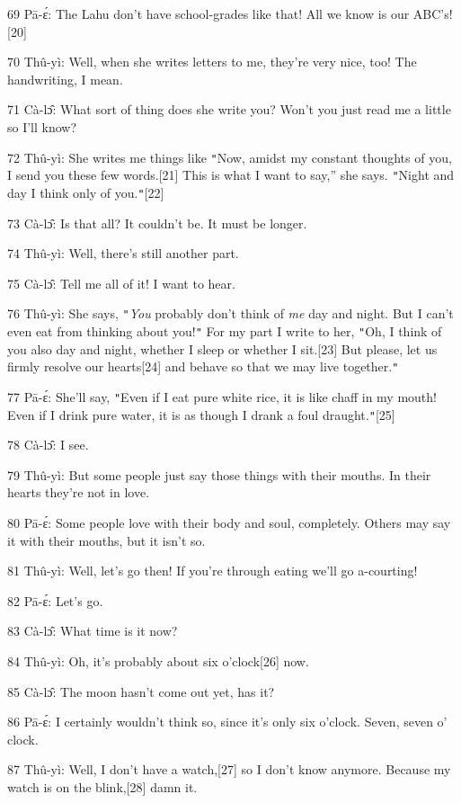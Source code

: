 {69 Pā-ɛ́: The Lahu don't have school-grades like that! All we know
is our ABC's![20]}

{70 Thû-yì: Well, when she writes letters to me, they're very nice, too!
The handwriting, I mean.}

{71 Cà-lɔ̂: What sort of thing does she write you? Won't you just read
me a little so I'll know?}

{72 Thû-yì: She writes me things like \texttt{"}Now, amidst my constant
thoughts of you, I send you these few words.[21] This is what I want to say,''
she says. \texttt{"}Night and day I think only of you.\texttt{"}[22]}

{73 Cà-lɔ̂: Is that all? It couldn't be. It must be longer.}

{74 Thû-yì: Well, there's still another part.}

{75 Cà-lɔ̂: Tell me all of it! I want to hear.}

{76 Thû-yì: She says, \texttt{"}}{\textit{You}}{ probably
don't think of }{\textit{me}}{ day and night. But I can't even eat
from thinking about you!\texttt{"} For my part I write to her, \texttt{"}Oh, I
think of you also day and night, whether I sleep or whether I sit.[23] But please,
let us firmly resolve our hearts[24] and behave so that we may live together.\texttt{"}
}

{77 Pā-ɛ́: She'll say, \texttt{"}Even if I eat pure white rice, it is
like chaff in my mouth! Even if I drink pure water, it is as though I drank a foul
draught.\texttt{"}[25]}

{78 Cà-lɔ̂: I see.}

{79 Thû-yì: But some people just say those things with their mouths. In
their hearts they're not in love.}

{80 Pā-ɛ́: Some people love with their body and soul, completely. Others
may say it with their mouths, but it isn't so.}

{81 Thû-yì: Well, let's go then! If you're through eating we'll go a-courting!}

{82 Pā-ɛ́: Let's go.}

{83 Cà-lɔ̂: What time is it now?}

{84 Thû-yì: Oh, it's probably about}{\textit{ }}{six o'clock[26]
now.}

{85 Cà-lɔ̂: The moon hasn't come out yet, has it?}

{86 Pā-ɛ́: I certainly wouldn't think so, since it's only six o'clock.
Seven, seven o' clock. }

{87 Thû-yì: Well, I don't have a watch,[27] so I don't know anymore. Because
my watch is on the blink,[28] damn it.}

